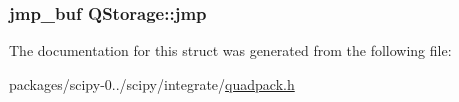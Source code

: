 \subsubsection[{jmp}]{\setlength{\rightskip}{0pt plus 5cm}jmp\+\_\+buf Q\+Storage\+::jmp}\label{structQStorage_adee913a5ca5d3087723e9e78a3f30650}


The documentation for this struct was generated from the following file\+:\begin{DoxyCompactItemize}
\item 
packages/scipy-\/0../scipy/integrate/\hyperlink{quadpack_8h}{quadpack.\+h}\end{DoxyCompactItemize}
